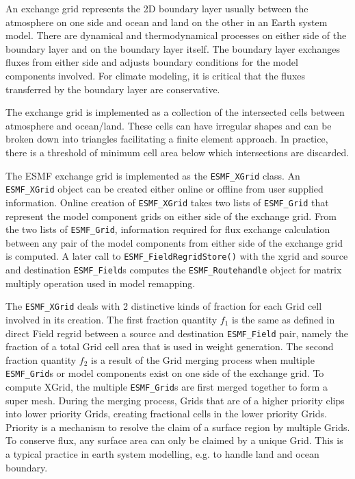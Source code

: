 
An exchange grid represents the 2D boundary layer usually between the
atmosphere on one side and ocean and land on the other in an Earth
system model. There are dynamical and thermodynamical processes on
either side of the boundary layer and on the boundary layer itself.
The boundary layer exchanges fluxes from either side and adjusts
boundary conditions for the model components involved. For climate modeling,
it is critical that the fluxes transferred by the boundary layer are
conservative.

The exchange grid is implemented as a collection of the intersected cells
between atmosphere and ocean/land\cite{BalajiXGrid}. These cells can have irregular shapes
and can be broken down into triangles facilitating a finite element
approach. In practice, there is a threshold of minimum cell area below
which intersections are discarded.

The ESMF exchange grid is implemented as the {\tt ESMF\_XGrid} class. 
An {\tt ESMF\_XGrid} object can be created either online or offline from
user supplied information. Online creation of {\tt ESMF\_XGrid} takes
two lists of {\tt ESMF\_Grid} that represent the model component grids on
either side of the exchange grid. From the two lists of {\tt ESMF\_Grid},
information required for flux exchange calculation between any pair of the 
model components from either side of the exchange grid is computed. A later
call to {\tt ESMF\_FieldRegridStore()} with the xgrid and source and destination
{\tt ESMF\_Field}s computes the {\tt ESMF\_Routehandle} object for matrix
multiply operation used in model remapping.

The {\tt ESMF\_XGrid} deals with 2 distinctive kinds of fraction for each Grid cell
involved in its creation. The first fraction quantity $f_1$ is the same as defined in direct
Field regrid between a source and destination {\tt ESMF\_Field} pair, namely the fraction
of a total Grid cell area that is used in weight generation. The second fraction quantity $f_2$
is a result of the Grid merging process when multiple {\tt ESMF\_Grid}s or model components
exist on one side of the exchange grid. To compute XGrid, the multiple {\tt ESMF\_Grid}s
are first merged together to form a super mesh. During the merging process, Grids that are
of a higher priority clips into lower priority Grids, creating fractional cells in the lower
priority Grids. Priority is a mechanism to resolve the claim of a surface region by multiple
Grids. To conserve flux, any surface area can only be claimed by a unique Grid. This is
a typical practice in earth system modelling, e.g. to handle land and ocean boundary.

